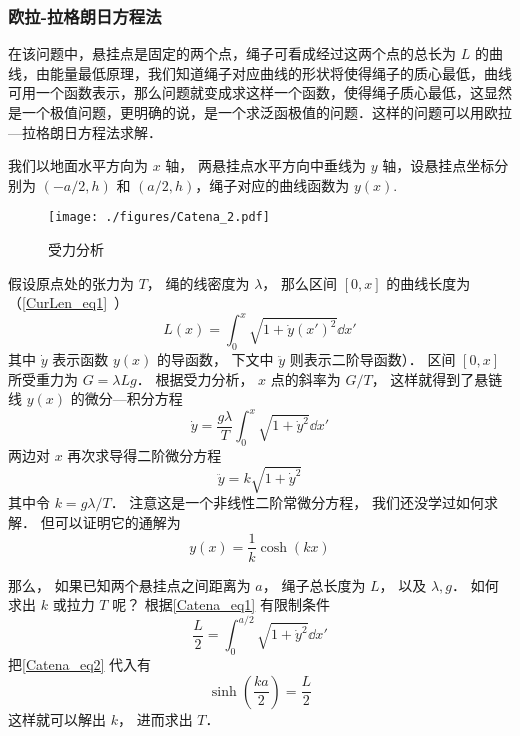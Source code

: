 \subsubsection{欧拉-拉格朗日方程法}
在该问题中，悬挂点是固定的两个点，绳子可看成经过这两个点的总长为 $L$ 的曲线，由能量最低原理，我们知道绳子对应曲线的形状将使得绳子的质心最低，曲线可用一个函数表示，那么问题就变成求这样一个函数，使得绳子质心最低，这显然是一个极值问题，更明确的说，是一个求泛函极值的问题．这样的问题可以用欧拉—拉格朗日方程法求解．

我们以地面水平方向为 $x$ 轴， 两悬挂点水平方向中垂线为 $y$ 轴，设悬挂点坐标分别为 $(-a/2,h)$ 和 $(a/2,h)$，绳子对应的曲线函数为 $y(x)$.
\begin{figure}[ht]
\centering
\texttt{[image: ./figures/Catena\_2.pdf]}
\caption{受力分析} \label{Catena_fig2}
\end{figure}
假设原点处的张力为 $T$， 绳的线密度为 $\lambda$， 那么区间 $[0, x]$ 的曲线长度为（\autoref{CurLen_eq1}~）
\begin{equation}\label{Catena_eq1}
L(x) = \int_0^x \sqrt{1 + \dot y(x')^2} \dd{x'}
\end{equation}
其中 $\dot y$ 表示函数 $y(x)$ 的导函数， 下文中 $\ddot y$ 则表示二阶导函数）． 区间 $[0, x]$ 所受重力为 $G = \lambda L g$． 根据受力分析， $x$ 点的斜率为 $G/T$， 这样就得到了悬链线 $y(x)$ 的微分—积分方程
\begin{equation}
\dot y = \frac{g\lambda}{T} \int_0^x \sqrt{1 + \dot y^2} \dd{x'}
\end{equation}
两边对 $x$ 再次求导得二阶微分方程
\begin{equation}
\ddot y = k \sqrt{1 + \dot y^2}
\end{equation}
其中令 $k = g\lambda/T$． 注意这是一个非线性二阶常微分方程， 我们还没学过如何求解． 但可以证明它的通解为
\begin{equation}\label{Catena_eq2}
y(x) = \frac{1}{k}\cosh(kx)
\end{equation}

那么， 如果已知两个悬挂点之间距离为 $a$， 绳子总长度为 $L$， 以及 $\lambda, g$． 如何求出 $k$ 或拉力 $T$ 呢？ 根据\autoref{Catena_eq1} 有限制条件
\begin{equation}
\frac{L}{2} = \int_0^{a/2} \sqrt{1 + \dot y^2} \dd{x'}
\end{equation}
把\autoref{Catena_eq2} 代入有
\begin{equation}
\sinh(\frac{ka}{2}) = \frac{L}{2}
\end{equation}
这样就可以解出 $k$， 进而求出 $T$．

